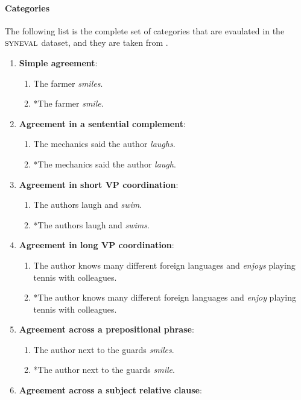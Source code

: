\paragraph{Categories} The following list is the complete set of categories that are evaulated in the $\textsc{syneval}$ dataset, and they are taken from \citet{linzen2018targeted}.
\begin{enumerate}[noitemsep]
  \item \textbf{Simple agreement}:
    \begin{enumerate}
      \item The farmer \textit{smiles}.
      \item *The farmer \textit{smile}.
    \end{enumerate}
  \item \textbf{Agreement in a sentential complement}:
    \begin{enumerate}
      \item The mechanics said the author \textit{laughs}.
      \item *The mechanics said the author \textit{laugh}.
    \end{enumerate}
  \item \textbf{Agreement in short VP coordination}:
    \begin{enumerate}
      \item The authors laugh and \textit{swim}.
      \item *The authors laugh and \textit{swims}.
    \end{enumerate}
  \item \textbf{Agreement in long VP coordination}:
    \begin{enumerate}
      \item The author knows many different foreign languages and \textit{enjoys} playing tennis with colleagues.
      \item *The author knows many different foreign languages and \textit{enjoy} playing tennis with colleagues.
    \end{enumerate}
  \item \textbf{Agreement across a prepositional phrase}:
    \begin{enumerate}
      \item The author next to the guards \textit{smiles}.
      \item *The author next to the guards \textit{smile}.
    \end{enumerate}
  \item \textbf{Agreement across a subject relative clause}:

\end{enumerate}
